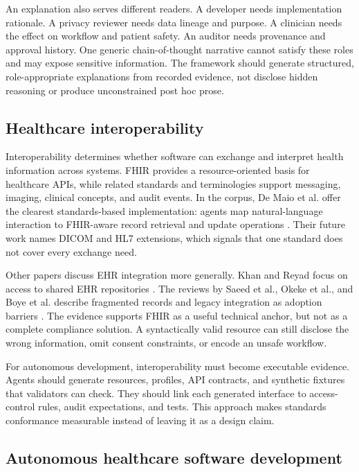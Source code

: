 \documentclass[11pt,a4paper]{article}
\begin{document}
An explanation also serves different readers. A developer needs implementation rationale. A privacy reviewer needs data lineage and purpose. A clinician needs the effect on workflow and patient safety. An auditor needs provenance and approval history. One generic chain-of-thought narrative cannot satisfy these roles and may expose sensitive information. The framework should generate structured, role-appropriate explanations from recorded evidence, not disclose hidden reasoning or produce unconstrained post hoc prose.

\subsection{Healthcare interoperability}

Interoperability determines whether software can exchange and interpret health information across systems. FHIR provides a resource-oriented basis for healthcare APIs, while related standards and terminologies support messaging, imaging, clinical concepts, and audit events. In the corpus, De Maio et al. offer the clearest standards-based implementation: agents map natural-language interaction to FHIR-aware record retrieval and update operations \cite[pp.~1--8]{demaio2025privacy}. Their future work names DICOM and HL7 extensions, which signals that one standard does not cover every exchange need.

Other papers discuss EHR integration more generally. Khan and Reyad focus on access to shared EHR repositories \cite{khan2019ibac}. The reviews by Saeed et al., Okeke et al., and Boye et al. describe fragmented records and legacy integration as adoption barriers \cite{saeed2025applications,okeke2025overview,boye2025decision}. The evidence supports FHIR as a useful technical anchor, but not as a complete compliance solution. A syntactically valid resource can still disclose the wrong information, omit consent constraints, or encode an unsafe workflow.

For autonomous development, interoperability must become executable evidence. Agents should generate resources, profiles, API contracts, and synthetic fixtures that validators can check. They should link each generated interface to access-control rules, audit expectations, and tests. This approach makes standards conformance measurable instead of leaving it as a design claim.

\subsection{Autonomous healthcare software development}
\end{document}
